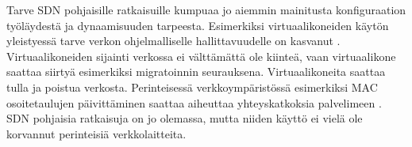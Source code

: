 
Tarve SDN pohjaisille ratkaisuille kumpuaa jo aiemmin mainitusta konfiguraation työläydestä ja dynaamisuuden tarpeesta. Esimerkiksi virtuaalikoneiden käytön yleistyessä tarve verkon ohjelmalliselle hallittavuudelle on kasvanut \cite{jammal2014software}. Virtuaalikoneiden sijainti verkossa ei välttämättä ole kiinteä, vaan virtuaalikone saattaa siirtyä esimerkiksi migratoinnin seurauksena. Virtuaalikoneita saattaa tulla ja poistua verkosta. Perinteisessä verkkoympäristössä esimerkiksi MAC osoitetaulujen päivittäminen saattaa aiheuttaa yhteyskatkoksia palvelimeen \cite{jammal2014software}. SDN pohjaisia ratkaisuja on jo olemassa, mutta niiden käyttö ei vielä ole korvannut perinteisiä verkkolaitteita. 

